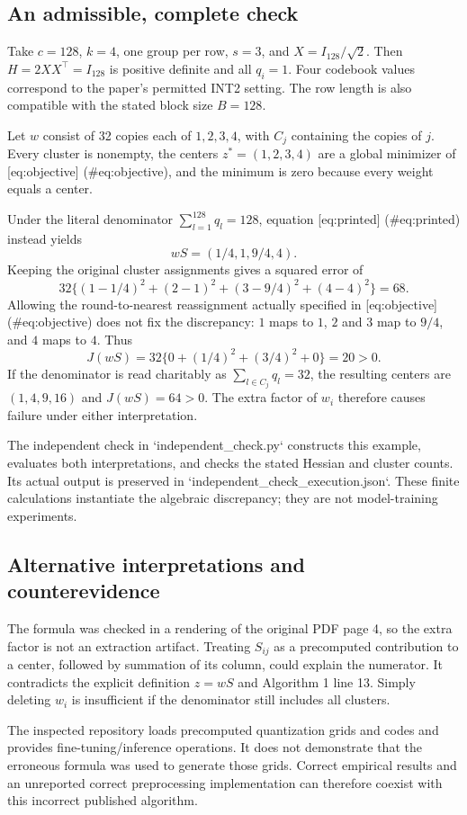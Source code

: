 \documentclass[10pt]{article}
\begin{document}
\subsection*{An admissible, complete check}
Take \(c=128\), \(k=4\), one group per row, \(s=3\), and \(X=I_{128}/\sqrt2\). Then \(H=2XX^\top=I_{128}\) is positive definite and all \(q_i=1\). Four codebook values correspond to the paper’s permitted INT2 setting. The row length is also compatible with the stated block size \(B=128\).\par
Let \(w\) consist of 32 copies each of \(1,2,3,4\), with \(C_j\) containing the copies of \(j\). Every cluster is nonempty, the centers \(z^*=(1,2,3,4)\) are a global minimizer of [eq:objective] (\#eq:objective), and the minimum is zero because every weight equals a center.\par
Under the literal denominator \(\sum_{l=1}^{128}q_l=128\), equation [eq:printed] (\#eq:printed) instead yields \[wS=(1/4,1,9/4,4).\] Keeping the original cluster assignments gives a squared error of \[32\{(1-1/4)^2+(2-1)^2+(3-9/4)^2+(4-4)^2\}=68.\] Allowing the round-to-nearest reassignment actually specified in [eq:objective] (\#eq:objective) does not fix the discrepancy: \(1\) maps to \(1\), \(2\) and \(3\) map to \(9/4\), and \(4\) maps to \(4\). Thus \[J(wS)=32\{0+(1/4)^2+(3/4)^2+0\}=20>0.\] If the denominator is read charitably as \(\sum_{l\in C_j}q_l=32\), the resulting centers are \((1,4,9,16)\) and \(J(wS)=64>0\). The extra factor of \(w_i\) therefore causes failure under either interpretation.\par
The independent check in `independent\_check.py` constructs this example, evaluates both interpretations, and checks the stated Hessian and cluster counts. Its actual output is preserved in `independent\_check\_execution.json`. These finite calculations instantiate the algebraic discrepancy; they are not model-training experiments.\par
\subsection*{Alternative interpretations and counterevidence}
The formula was checked in a rendering of the original PDF page 4, so the extra factor is not an extraction artifact. Treating \(S_{ij}\) as a precomputed contribution to a center, followed by summation of its column, could explain the numerator. It contradicts the explicit definition \(z=wS\) and Algorithm 1 line 13. Simply deleting \(w_i\) is insufficient if the denominator still includes all clusters.\par
The inspected repository loads precomputed quantization grids and codes and provides fine-tuning/inference operations. It does not demonstrate that the erroneous formula was used to generate those grids. Correct empirical results and an unreported correct preprocessing implementation can therefore coexist with this incorrect published algorithm.\par
\end{document}

